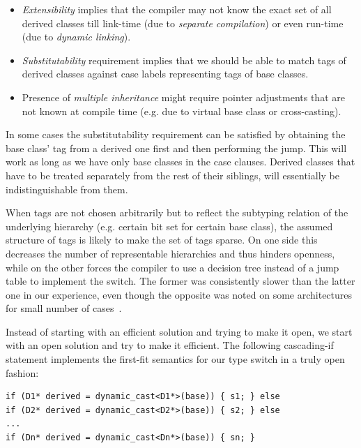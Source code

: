 \begin{itemize}
\setlength{\itemsep}{0pt}
\setlength{\parskip}{0pt}
\item \emph{Extensibility} implies that the compiler may not know the exact set 
      of all derived classes till link-time (due to \emph{separate compilation}) 
      or even run-time (due to \emph{dynamic linking}).
\item \emph{Substitutability} requirement implies that we should be able to 
      match tags of derived classes against case labels representing tags of 
      base classes.
\item Presence of \emph{multiple inheritance} might require pointer adjustments 
      that are not known at compile time (e.g. due to virtual base class or 
      cross-casting).
\end{itemize}

\noindent
In some cases the substitutability requirement can be satisfied by obtaining 
the base class' tag from a derived one first and then performing the jump. 
This will work as long as we have only base classes in the case clauses.
Derived classes that have to be treated separately from the rest of their 
siblings, will essentially be indistinguishable from them.

When tags are not chosen arbitrarily but to reflect the subtyping relation of the 
underlying hierarchy (e.g. certain bit set for certain base class), the assumed 
structure of tags is likely to make the set of tags sparse. On one side this 
decreases the number of representable hierarchies and thus hinders openness, 
while on the other forces the compiler to use a decision tree instead of a jump 
table to implement the switch. The former was consistently slower than the 
latter one in our experience, even though the opposite was noted on some 
architectures for small number of cases~\cite[]{garrigue-98}.

Instead of starting with an efficient solution and trying to make it open, we 
start with an open solution and try to make it efficient. The following 
cascading-if statement implements the first-fit semantics for our type switch in 
a truly open fashion:

\begin{lstlisting}
if (D1* derived = dynamic_cast<D1*>(base)) { s1; } else
if (D2* derived = dynamic_cast<D2*>(base)) { s2; } else
...
if (Dn* derived = dynamic_cast<Dn*>(base)) { sn; }
\end{lstlisting}

